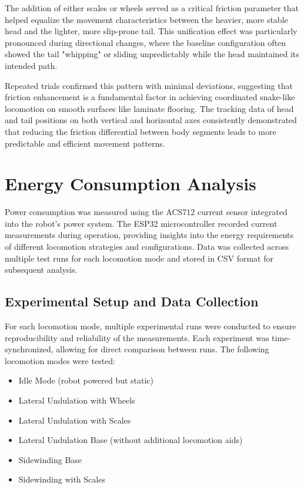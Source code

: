 \documentclass[12pt,a4paper]{report}
\begin{document}
The addition of either scales or wheels served as a critical friction parameter that helped equalize the movement characteristics between the heavier, more stable head and the lighter, more slip-prone tail. This unification effect was particularly pronounced during directional changes, where the baseline configuration often showed the tail "whipping" or sliding unpredictably while the head maintained its intended path.

Repeated trials confirmed this pattern with minimal deviations, suggesting that friction enhancement is a fundamental factor in achieving coordinated snake-like locomotion on smooth surfaces like laminate flooring. The tracking data of head and tail positions on both vertical and horizontal axes consistently demonstrated that reducing the friction differential between body segments leads to more predictable and efficient movement patterns.

\section{Energy Consumption Analysis}
Power consumption was measured using the ACS712 current sensor integrated into the robot's power system. The ESP32 microcontroller recorded current measurements during operation, providing insights into the energy requirements of different locomotion strategies and configurations. Data was collected across multiple test runs for each locomotion mode and stored in CSV format for subsequent analysis.

\subsection{Experimental Setup and Data Collection}
For each locomotion mode, multiple experimental runs were conducted to ensure reproducibility and reliability of the measurements. Each experiment was time-synchronized, allowing for direct comparison between runs. The following locomotion modes were tested:

\begin{itemize}
    \item Idle Mode (robot powered but static)
    \item Lateral Undulation with Wheels
    \item Lateral Undulation with Scales
    \item Lateral Undulation Base (without additional locomotion aids)
    \item Sidewinding Base
    \item Sidewinding with Scales
\end{itemize}
\end{document}
